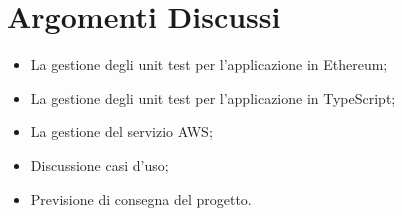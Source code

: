 \section{Argomenti Discussi}
	\begin{itemize}
		\item La gestione degli unit test per l'applicazione in Ethereum;
		\item La gestione degli unit test per l'applicazione in TypeScript;
		\item La gestione del servizio AWS;
		\item Discussione casi d'uso;
		\item Previsione di consegna del progetto.
	\end{itemize}
